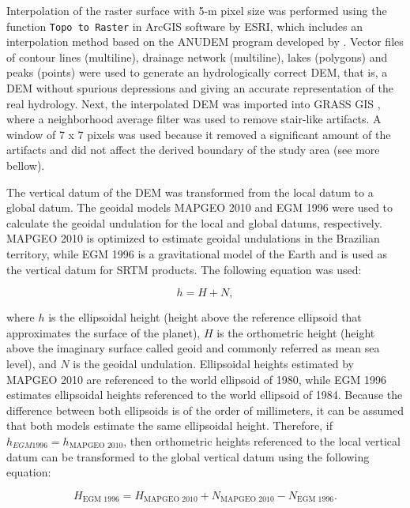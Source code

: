 Interpolation of the raster surface with 5-m pixel size was performed using the function \texttt{Topo to Raster} in ArcGIS\textregistered{} software by ESRI, which includes an interpolation method based on the ANUDEM program developed by \cite{Hutchinson1989}. Vector files of contour lines (multiline), drainage network (multiline), lakes (polygons) and peaks (points) were used to generate an hydrologically correct DEM, that is, a DEM without spurious depressions and giving an accurate representation of the real hydrology. Next, the interpolated DEM was imported into GRASS GIS \cite{GRASS2012}, where a neighborhood average filter was used to remove stair-like artifacts. A window of 7 x 7 pixels was used because it removed a significant amount of the artifacts and did not affect the derived boundary of the study area (see more bellow).

The vertical datum of the DEM was transformed from the local datum to a global datum. The geoidal models MAPGEO 2010 \cite{IBGE2010a} and EGM 1996 \cite{LemoineEtAl1998} were used to calculate the geoidal undulation for the local and global datums, respectively. MAPGEO 2010 is optimized to estimate geoidal undulations in the Brazilian territory, while EGM 1996 is a gravitational model of the Earth and is used as the vertical datum for SRTM products. The following equation was used:

\begin{center}
  \label{eq:geoidal}
  \begin{equation}
    h = H + N,
  \end{equation}
\end{center}

\noindent where $h$ is the ellipsoidal height (height above the reference ellipsoid that approximates the surface of the planet), $H$ is the orthometric height (height above the imaginary surface called geoid and commonly referred as mean sea level), and $N$ is the geoidal undulation. Ellipsoidal heights estimated by MAPGEO 2010 are referenced to the world ellipsoid of 1980, while EGM 1996 estimates ellipsoidal heights referenced to the world ellipsoid of 1984. Because the difference between both ellipsoids is of the order of millimeters, it can be assumed that both models estimate the same ellipsoidal height. Therefore, if $h_{EGM 1996} = h_{\text{MAPGEO 2010}}$, then orthometric heights referenced to the local vertical datum can be transformed to the global vertical datum using the following equation:

\begin{center}
  \begin{equation}
    H_{\text{EGM 1996}} = H_{\text{MAPGEO 2010}} + N_{\text{MAPGEO 2010}} - N_{\text{EGM 1996}}.
  \end{equation}
\end{center}

